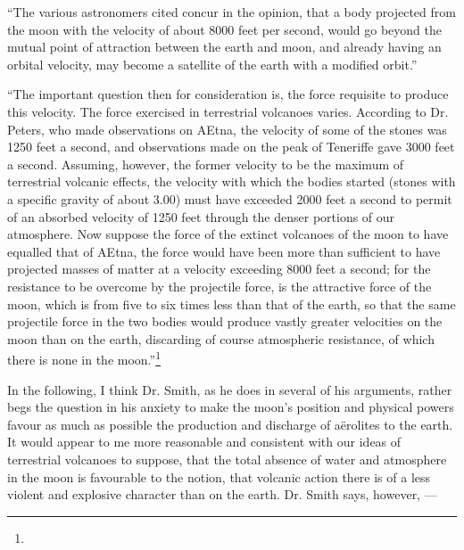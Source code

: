 \documentclass[a4paper, 12pt, oneside]{article}
\begin{document}
``The various astronomers cited concur in the opinion, that a body projected from the moon with the velocity of about 8000 feet per second, would go beyond the mutual point of attraction between the earth and moon, and already having an orbital velocity, may become a satellite of the earth with a modified orbit.''

``The important question then for consideration is, the force requisite to produce this velocity. The force exercised in terrestrial volcanoes varies. According to Dr. Peters, who made observations on AEtna, the velocity of some of the stones was 1250 feet a second, and observations made on the peak of Teneriffe gave 3000 feet a second. Assuming, however, the former velocity to be the maximum of terrestrial volcanic effects, the velocity with which the bodies started (stones with a specific gravity of about 3.00) must have exceeded 2000 feet a second to permit of an absorbed velocity of 1250 feet through the denser portions of our atmosphere. Now suppose the force of the extinct volcanoes of the moon to have equalled that of AEtna, the force would have been more than sufficient to have projected masses of matter at a velocity exceeding 8000 feet a second; for the resistance to be overcome by the projectile force, is the attractive force of the moon, which is from five to six times less than that of the earth, so that the same projectile force in the two bodies would produce vastly greater velocities on the moon than on the earth, discarding of course atmospheric resistance, of which there is none in the moon.''\footnote{}

In the following, I think Dr. Smith, as he does in several of his arguments, rather begs the question in his anxiety to make the moon's position and physical powers favour as much as possible the production and discharge of aërolites to the earth. It would appear to me more reasonable and consistent with our ideas of terrestrial volcanoes to suppose, that the total absence of water and atmosphere in the moon is favourable to the notion, that volcanic action there is of a less violent and explosive character than on the earth. Dr. Smith says, however, ---
\end{document}
